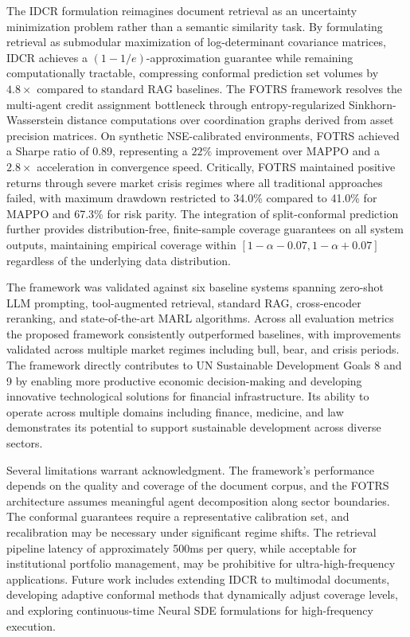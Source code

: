 \documentclass[12pt,a4paper,oneside]{report}
\theoremstyle{definition}
\theoremstyle{remark}
\begin{document}
The IDCR formulation reimagines document retrieval as an uncertainty minimization problem rather than a semantic similarity task. By formulating retrieval as submodular maximization of log-determinant covariance matrices, IDCR achieves a $(1-1/e)$-approximation guarantee while remaining computationally tractable, compressing conformal prediction set volumes by $4.8\times$ compared to standard RAG baselines. The FOTRS framework resolves the multi-agent credit assignment bottleneck through entropy-regularized Sinkhorn-Wasserstein distance computations over coordination graphs derived from asset precision matrices. On synthetic NSE-calibrated environments, FOTRS achieved a Sharpe ratio of 0.89, representing a $22\%$ improvement over MAPPO and a $2.8\times$ acceleration in convergence speed. Critically, FOTRS maintained positive returns through severe market crisis regimes where all traditional approaches failed, with maximum drawdown restricted to 34.0\% compared to 41.0\% for MAPPO and 67.3\% for risk parity. The integration of split-conformal prediction further provides distribution-free, finite-sample coverage guarantees on all system outputs, maintaining empirical coverage within $[1-\alpha-0.07, 1-\alpha+0.07]$ regardless of the underlying data distribution.

The framework was validated against six baseline systems spanning zero-shot LLM prompting, tool-augmented retrieval, standard RAG, cross-encoder reranking, and state-of-the-art MARL algorithms. Across all evaluation metrics the proposed framework consistently outperformed baselines, with improvements validated across multiple market regimes including bull, bear, and crisis periods. The framework directly contributes to UN Sustainable Development Goals 8 and 9 by enabling more productive economic decision-making and developing innovative technological solutions for financial infrastructure. Its ability to operate across multiple domains including finance, medicine, and law demonstrates its potential to support sustainable development across diverse sectors.

Several limitations warrant acknowledgment. The framework's performance depends on the quality and coverage of the document corpus, and the FOTRS architecture assumes meaningful agent decomposition along sector boundaries. The conformal guarantees require a representative calibration set, and recalibration may be necessary under significant regime shifts. The retrieval pipeline latency of approximately 500ms per query, while acceptable for institutional portfolio management, may be prohibitive for ultra-high-frequency applications. Future work includes extending IDCR to multimodal documents, developing adaptive conformal methods that dynamically adjust coverage levels, and exploring continuous-time Neural SDE formulations for high-frequency execution.
\end{document}
